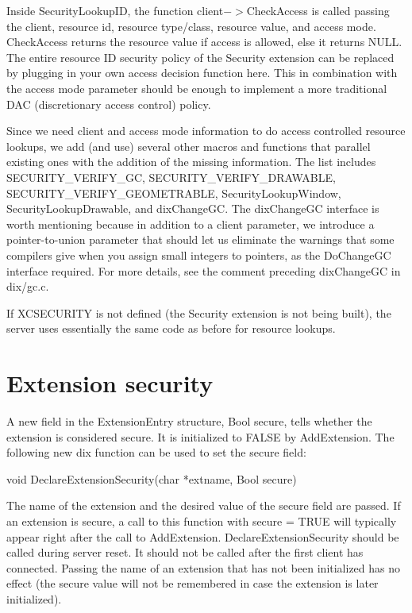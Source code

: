 Inside SecurityLookupID, the function client$->$CheckAccess is called
passing the client, resource id, resource type/class, resource value,
and access mode.  CheckAccess returns the resource value if access is
allowed, else it returns NULL.  The entire resource ID security policy
of the Security extension can be replaced by plugging in your own
access decision function here.  This in combination with the access
mode parameter should be enough to implement a more traditional DAC
(discretionary access control) policy.

Since we need client and access mode information to do access
controlled resource lookups, we add (and use) several other macros and
functions that parallel existing ones with the addition of the missing
information.  The list includes SECURITY\_VERIFY\_GC,
SECURITY\_VERIFY\_DRAWABLE, SECURITY\_VERIFY\_GEOMETRABLE,
SecurityLookupWindow, SecurityLookupDrawable, and dixChangeGC.  The
dixChangeGC interface is worth mentioning because in addition to a
client parameter, we introduce a pointer-to-union parameter that
should let us eliminate the warnings that some compilers give when you
assign small integers to pointers, as the DoChangeGC interface
required.  For more details, see the comment preceding dixChangeGC in
dix/gc.c.

If XCSECURITY is not defined (the Security extension is not being
built), the server uses essentially the same code as before for
resource lookups.

\section{Extension security}

A new field in the ExtensionEntry structure, Bool secure, tells
whether the extension is considered secure.  It is initialized to
FALSE by AddExtension.  The following new dix function can be used to
set the secure field:

void DeclareExtensionSecurity(char *extname, Bool secure)

The name of the extension and the desired value of the secure field
are passed.  If an extension is secure, a call to this function with
secure = TRUE will typically appear right after the call to
AddExtension.  DeclareExtensionSecurity should be called during server
reset.  It should not be called after the first client has connected.
Passing the name of an extension that has not been initialized has no
effect (the secure value will not be remembered in case the extension
is later initialized).


